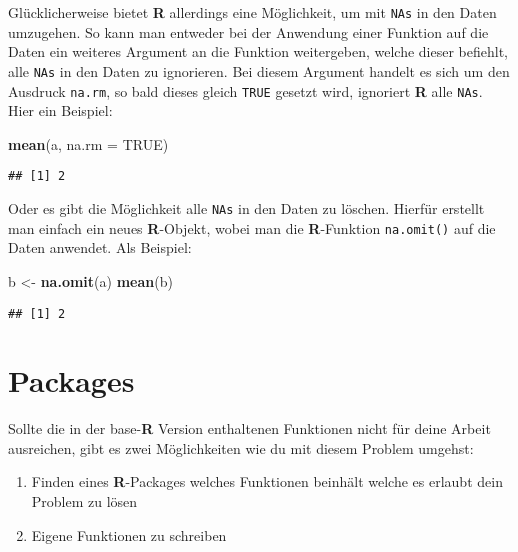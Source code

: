 \documentclass[
]{book}
\newenvironment{Shaded}{\begin{snugshade}}{\end{snugshade}}
\newcommand{\DataTypeTok}[1]{\textcolor[rgb]{0.13,0.29,0.53}{#1}}
\newcommand{\KeywordTok}[1]{\textcolor[rgb]{0.13,0.29,0.53}{\textbf{#1}}}
\newcommand{\NormalTok}[1]{#1}
\newcommand{\OtherTok}[1]{\textcolor[rgb]{0.56,0.35,0.01}{#1}}
\newcommand{\StringTok}[1]{\textcolor[rgb]{0.31,0.60,0.02}{#1}}
\providecommand{\tightlist}{%
  \setlength{\itemsep}{0pt}\setlength{\parskip}{0pt}}
\begin{document}
Glücklicherweise bietet \textbf{R} allerdings eine Möglichkeit, um mit \texttt{NAs} in den Daten umzugehen.
So kann man entweder bei der Anwendung einer Funktion auf die Daten ein weiteres Argument an die Funktion weitergeben, welche dieser befiehlt, alle \texttt{NAs} in den Daten zu ignorieren.
Bei diesem Argument handelt es sich um den Ausdruck \texttt{na.rm}, so bald dieses gleich \texttt{TRUE} gesetzt wird, ignoriert \textbf{R} alle \texttt{NAs}.
Hier ein Beispiel:

\begin{Shaded}
\begin{Highlighting}[]
\KeywordTok{mean}\NormalTok{(a, }\DataTypeTok{na.rm =} \OtherTok{TRUE}\NormalTok{)}
\end{Highlighting}
\end{Shaded}

\begin{verbatim}
## [1] 2
\end{verbatim}

Oder es gibt die Möglichkeit alle \texttt{NAs} in den Daten zu löschen.
Hierfür erstellt man einfach ein neues \textbf{R}-Objekt, wobei man die \textbf{R}-Funktion \texttt{na.omit()} auf die Daten anwendet.
Als Beispiel:

\begin{Shaded}
\begin{Highlighting}[]
\NormalTok{b <-}\StringTok{ }\KeywordTok{na.omit}\NormalTok{(a)}
\KeywordTok{mean}\NormalTok{(b)}
\end{Highlighting}
\end{Shaded}

\begin{verbatim}
## [1] 2
\end{verbatim}

\hypertarget{packages}{%
\section{Packages}\label{packages}}

Sollte die in der base-\textbf{R} Version enthaltenen Funktionen nicht für deine Arbeit ausreichen, gibt es zwei Möglichkeiten wie du mit diesem Problem umgehst:

\begin{enumerate}
\def\labelenumi{\arabic{enumi}.}
\tightlist
\item
  Finden eines \textbf{R}-Packages welches Funktionen beinhält welche es erlaubt dein Problem zu lösen
\item
  Eigene Funktionen zu schreiben
\end{enumerate}
\end{document}
